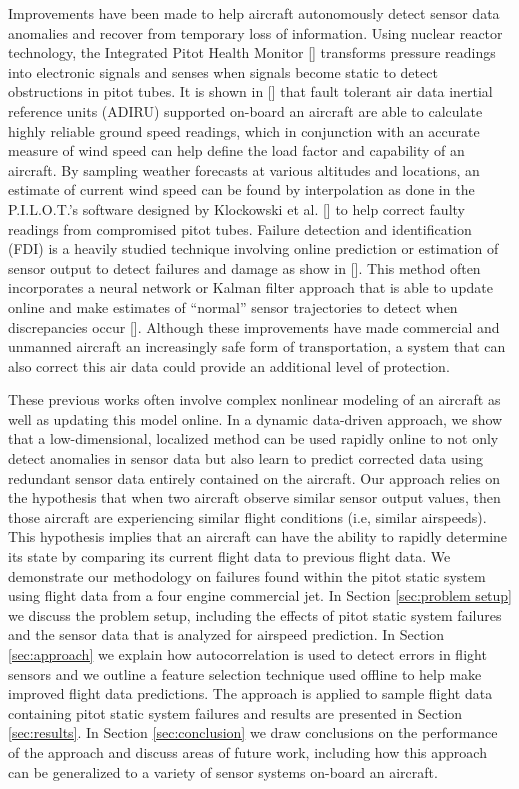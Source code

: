 \documentclass[]{aiaa-tc}
\begin{document}
Improvements have been made to help aircraft autonomously detect sensor data anomalies and recover from temporary loss of information. Using nuclear reactor technology, the Integrated Pitot Health Monitor [] transforms pressure readings into electronic signals and senses when signals become static to detect obstructions in pitot tubes. It is shown in [] that fault tolerant air data inertial reference units (ADIRU) supported on-board an aircraft are able to calculate highly reliable ground speed readings, which in conjunction with an accurate measure of wind speed can help define the load factor and capability of an aircraft. By sampling weather forecasts at various altitudes and locations, an estimate of current wind speed can be found by interpolation as done in the P.I.L.O.T.'s software designed by Klockowski et al. [] to help correct faulty readings from compromised pitot tubes. Failure detection and identification (FDI) is a heavily studied technique involving online prediction or estimation of sensor output to detect failures and damage as show in []. This method often incorporates a neural network or Kalman filter approach that is able to update online and make estimates of ``normal'' sensor trajectories to  detect when discrepancies occur [].  Although these improvements have made commercial and unmanned aircraft an increasingly safe form of transportation, a system that can also correct this air data could provide an additional level of protection. 

These previous works often involve complex nonlinear modeling of an aircraft as well as updating this model online. In a dynamic data-driven approach, we show that a low-dimensional, localized method can be used rapidly online to not only detect anomalies in sensor data but also learn to predict corrected data using redundant sensor data entirely contained on the aircraft. Our approach relies on the hypothesis that when two aircraft observe similar sensor output values, then those aircraft are experiencing similar flight conditions (i.e, similar airspeeds). This hypothesis implies that an aircraft can have the ability to rapidly determine its state by comparing its current flight data to previous flight data. We demonstrate our methodology on failures found within the pitot static system using flight data from a four engine commercial jet. In Section \ref{sec:problem setup} we discuss the problem setup, including the effects of pitot static system failures and the sensor data that is analyzed for airspeed prediction. In Section \ref{sec:approach} we explain how autocorrelation is used to detect errors in flight sensors and we outline a feature selection technique used offline to help make improved flight data predictions. The approach is applied to sample flight data containing pitot static system failures and results are presented in Section \ref{sec:results}. In Section \ref{sec:conclusion} we draw conclusions on the performance of the approach and discuss areas of future work, including how this approach can be generalized to a variety of sensor systems on-board an aircraft. 
\end{document}
